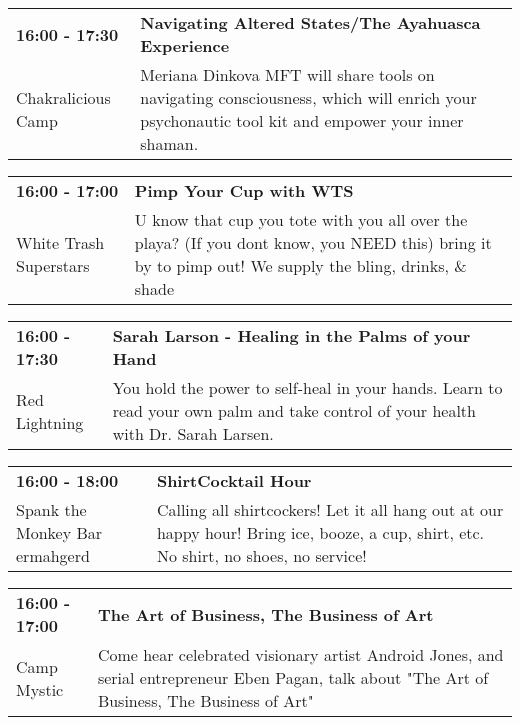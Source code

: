 \begin{tabular}{ p{1in} p{2.2in} }
    \textbf{16:00 - 17:30} & \textbf{Navigating Altered States/The Ayahuasca Experience} \\
    Chakralicious Camp \newline  & Meriana Dinkova MFT will share tools on navigating consciousness, which will enrich your psychonautic tool kit and empower your inner shaman. \\
    \hline 
\end{tabular}
    
\begin{tabular}{ p{1in} p{2.2in} }
    \textbf{16:00 - 17:00} & \textbf{Pimp Your Cup with WTS} \\
    White Trash Superstars \newline  & U know that cup you tote with you all over the playa? (If you dont know, you NEED this) bring it by to pimp out! We supply the bling, drinks, \& shade \\
    \hline 
\end{tabular}
    
\begin{tabular}{ p{1in} p{2.2in} }
    \textbf{16:00 - 17:30} & \textbf{Sarah Larson - Healing in the Palms of your Hand} \\
    Red Lightning \newline  & You hold the power to self-heal in your hands. Learn to read your own palm and take control of your health with Dr. Sarah Larsen. \\
    \hline 
\end{tabular}
    
\begin{tabular}{ p{1in} p{2.2in} }
    \textbf{16:00 - 18:00} & \textbf{ShirtCocktail Hour} \\
    Spank the Monkey Bar \newline ermahgerd & Calling all shirtcockers! Let it all hang out at our happy hour! Bring ice, booze, a cup, shirt, etc. No shirt, no shoes, no service! \\
    \hline 
\end{tabular}
    
\begin{tabular}{ p{1in} p{2.2in} }
    \textbf{16:00 - 17:00} & \textbf{The Art of Business, The Business of Art } \\
    Camp Mystic \newline  & Come hear celebrated visionary artist Android Jones, and serial entrepreneur Eben Pagan, talk about "The Art of Business, The Business of Art" \\
    \hline 
\end{tabular}
    

